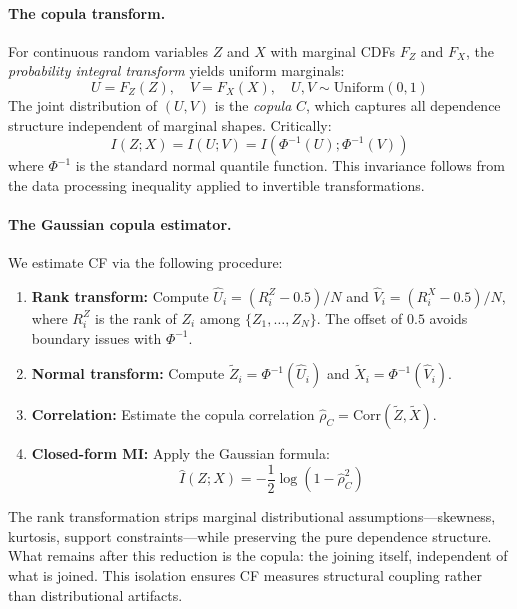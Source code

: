 \documentclass[10pt]{article} %
\theoremstyle{plain}
\theoremstyle{definition}
\newcommand{\MI}{I}
\begin{document}
\paragraph{The copula transform.} For continuous random variables $Z$ and $X$ with marginal CDFs $F_Z$ and $F_X$, the \emph{probability integral transform} yields uniform marginals:
\begin{equation}
U = F_Z(Z), \quad V = F_X(X), \quad U, V \sim \text{Uniform}(0,1)
\end{equation}
The joint distribution of $(U, V)$ is the \emph{copula} $C$, which captures all dependence structure independent of marginal shapes. Critically:
\begin{equation}
\MI(Z; X) = \MI(U; V) = \MI(\Phi^{-1}(U); \Phi^{-1}(V))
\label{eq:mi-invariance}
\end{equation}
where $\Phi^{-1}$ is the standard normal quantile function. This invariance follows from the data processing inequality applied to invertible transformations.

\paragraph{The Gaussian copula estimator.} We estimate CF via the following procedure:
\begin{enumerate}[nosep]
    \item \textbf{Rank transform:} Compute $\hat{U}_i = (R_i^Z - 0.5)/N$ and $\hat{V}_i = (R_i^X - 0.5)/N$, where $R_i^Z$ is the rank of $Z_i$ among $\{Z_1, \ldots, Z_N\}$. The offset of $0.5$ avoids boundary issues with $\Phi^{-1}$.
    \item \textbf{Normal transform:} Compute $\tilde{Z}_i = \Phi^{-1}(\hat{U}_i)$ and $\tilde{X}_i = \Phi^{-1}(\hat{V}_i)$.
    \item \textbf{Correlation:} Estimate the copula correlation $\hat{\rho}_C = \text{Corr}(\tilde{Z}, \tilde{X})$.
    \item \textbf{Closed-form MI:} Apply the Gaussian formula:
    \begin{equation}
    \widehat{\MI}(Z; X) = -\frac{1}{2}\log(1 - \hat{\rho}_C^2)
    \label{eq:copula-mi}
    \end{equation}
\end{enumerate}

The rank transformation strips marginal distributional assumptions---skewness, kurtosis, support constraints---while preserving the pure dependence structure. What remains after this reduction is the copula: the joining itself, independent of what is joined. This isolation ensures CF measures structural coupling rather than distributional artifacts.
\end{document}
